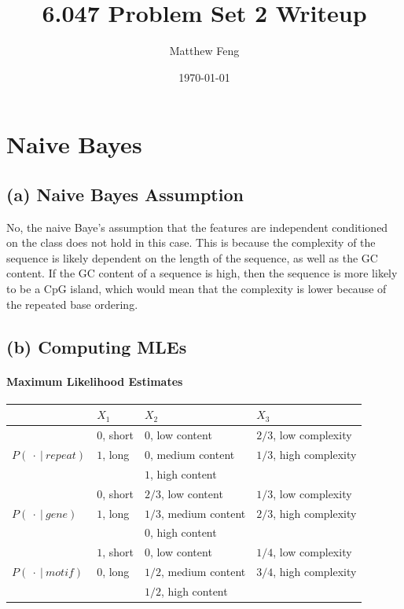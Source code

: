 \documentclass[11pt]{article}
\title{6.047 Problem Set 2 Writeup}
\author{Matthew Feng}
\date{\today}
\begin{document}
\maketitle
\section{Naive Bayes}
\subsection*{(a) Naive Bayes Assumption}
No, the naive Baye's assumption that the features
are independent conditioned on the class does not hold
in this case. This is because the complexity of the
sequence is likely dependent on the length of the
sequence, as well as the GC content. If the GC content
of a sequence is high, then the sequence is more likely
to be a CpG island, which would mean that the complexity
is lower because of the repeated base ordering.

\subsection*{(b) Computing MLEs}

\paragraph{Maximum Likelihood Estimates}

\begin{center}
\begin{tabular} { l | l  l  l }
& $X_1$ & $X_2$ & $X_3$ \\
\hline
\multirow{3}{6em}{$P(\ \cdot\ |\ repeat)$}
& $0$, short & $0$, low content    & $2/3$, low complexity \\
& $1$, long  & $0$, medium content & $1/3$, high complexity\\
&            & $1$, high content   & \\
\hline
\multirow{3}{6em}{$P(\ \cdot\ |\ gene)$}
& $0$, short & $2/3$, low content    & $1/3$, low complexity \\
& $1$, long  & $1/3$, medium content & $2/3$, high complexity\\
&            & $0$,   high content   & \\
\hline
\multirow{3}{6em}{$P(\ \cdot\ |\ motif)$}
& $1$, short & $0$,   low content    & $1/4$, low complexity \\
& $0$, long  & $1/2$, medium content & $3/4$, high complexity\\
&            & $1/2$, high content   & \\
\end{tabular}
\end{center}
\end{document}

